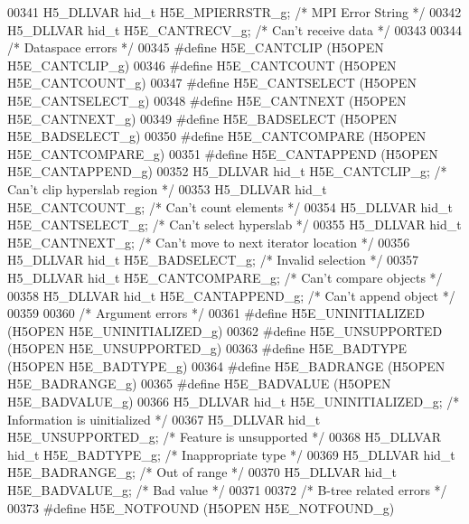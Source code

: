 \begin{DoxyCode}
00341 H5\_DLLVAR hid\_t H5E\_MPIERRSTR\_g;     \textcolor{comment}{/* MPI Error String */}
00342 H5\_DLLVAR hid\_t H5E\_CANTRECV\_g;      \textcolor{comment}{/* Can't receive data */}
00343 
00344 \textcolor{comment}{/* Dataspace errors */}
00345 \textcolor{preprocessor}{#define H5E\_CANTCLIP         (H5OPEN H5E\_CANTCLIP\_g)}
00346 \textcolor{preprocessor}{#define H5E\_CANTCOUNT        (H5OPEN H5E\_CANTCOUNT\_g)}
00347 \textcolor{preprocessor}{#define H5E\_CANTSELECT       (H5OPEN H5E\_CANTSELECT\_g)}
00348 \textcolor{preprocessor}{#define H5E\_CANTNEXT         (H5OPEN H5E\_CANTNEXT\_g)}
00349 \textcolor{preprocessor}{#define H5E\_BADSELECT        (H5OPEN H5E\_BADSELECT\_g)}
00350 \textcolor{preprocessor}{#define H5E\_CANTCOMPARE      (H5OPEN H5E\_CANTCOMPARE\_g)}
00351 \textcolor{preprocessor}{#define H5E\_CANTAPPEND       (H5OPEN H5E\_CANTAPPEND\_g)}
00352 H5\_DLLVAR hid\_t H5E\_CANTCLIP\_g;      \textcolor{comment}{/* Can't clip hyperslab region */}
00353 H5\_DLLVAR hid\_t H5E\_CANTCOUNT\_g;     \textcolor{comment}{/* Can't count elements */}
00354 H5\_DLLVAR hid\_t H5E\_CANTSELECT\_g;    \textcolor{comment}{/* Can't select hyperslab */}
00355 H5\_DLLVAR hid\_t H5E\_CANTNEXT\_g;      \textcolor{comment}{/* Can't move to next iterator location */}
00356 H5\_DLLVAR hid\_t H5E\_BADSELECT\_g;     \textcolor{comment}{/* Invalid selection */}
00357 H5\_DLLVAR hid\_t H5E\_CANTCOMPARE\_g;   \textcolor{comment}{/* Can't compare objects */}
00358 H5\_DLLVAR hid\_t H5E\_CANTAPPEND\_g;    \textcolor{comment}{/* Can't append object */}
00359 
00360 \textcolor{comment}{/* Argument errors */}
00361 \textcolor{preprocessor}{#define H5E\_UNINITIALIZED    (H5OPEN H5E\_UNINITIALIZED\_g)}
00362 \textcolor{preprocessor}{#define H5E\_UNSUPPORTED      (H5OPEN H5E\_UNSUPPORTED\_g)}
00363 \textcolor{preprocessor}{#define H5E\_BADTYPE          (H5OPEN H5E\_BADTYPE\_g)}
00364 \textcolor{preprocessor}{#define H5E\_BADRANGE         (H5OPEN H5E\_BADRANGE\_g)}
00365 \textcolor{preprocessor}{#define H5E\_BADVALUE         (H5OPEN H5E\_BADVALUE\_g)}
00366 H5\_DLLVAR hid\_t H5E\_UNINITIALIZED\_g; \textcolor{comment}{/* Information is uinitialized */}
00367 H5\_DLLVAR hid\_t H5E\_UNSUPPORTED\_g;   \textcolor{comment}{/* Feature is unsupported */}
00368 H5\_DLLVAR hid\_t H5E\_BADTYPE\_g;       \textcolor{comment}{/* Inappropriate type */}
00369 H5\_DLLVAR hid\_t H5E\_BADRANGE\_g;      \textcolor{comment}{/* Out of range */}
00370 H5\_DLLVAR hid\_t H5E\_BADVALUE\_g;      \textcolor{comment}{/* Bad value */}
00371 
00372 \textcolor{comment}{/* B-tree related errors */}
00373 \textcolor{preprocessor}{#define H5E\_NOTFOUND         (H5OPEN H5E\_NOTFOUND\_g)}

\end{DoxyCode}
